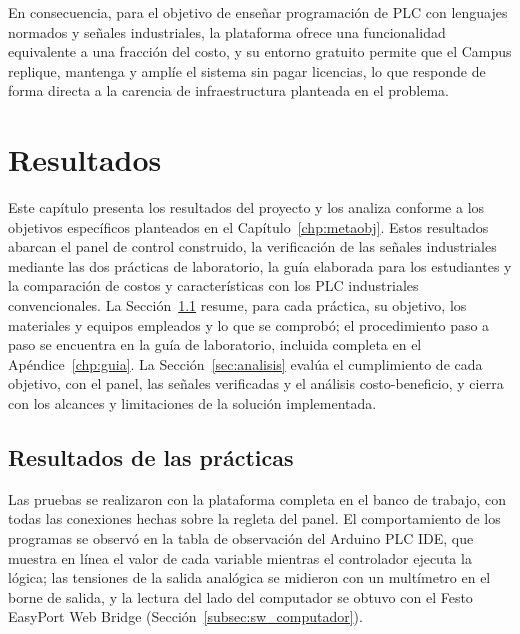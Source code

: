 \documentclass[12pt,a4paper,oneside]{report}
\begin{document}
En consecuencia, para el objetivo de enseñar programación de PLC con lenguajes normados y señales industriales, la plataforma ofrece una funcionalidad equivalente a una fracción del costo, y su entorno gratuito permite que el Campus replique, mantenga y amplíe el sistema sin pagar licencias, lo que responde de forma directa a la carencia de infraestructura planteada en el problema.


\chapter{Resultados}
\label{chp:resultados}

Este capítulo presenta los resultados del proyecto y los analiza conforme a los objetivos específicos planteados en el Capítulo~\ref{chp:metaobj}. Estos resultados abarcan el panel de control construido, la verificación de las señales industriales mediante las dos prácticas de laboratorio, la guía elaborada para los estudiantes y la comparación de costos y características con los PLC industriales convencionales. La Sección~\ref{sec:resultados} resume, para cada práctica, su objetivo, los materiales y equipos empleados y lo que se comprobó; el procedimiento paso a paso se encuentra en la guía de laboratorio, incluida completa en el Apéndice~\ref{chp:guia}. La Sección~\ref{sec:analisis} evalúa el cumplimiento de cada objetivo, con el panel, las señales verificadas y el análisis costo-beneficio, y cierra con los alcances y limitaciones de la solución implementada.

\section{Resultados de las prácticas}
\label{sec:resultados}

Las pruebas se realizaron con la plataforma completa en el banco de trabajo, con todas las conexiones hechas sobre la regleta del panel. El comportamiento de los programas se observó en la tabla de observación del Arduino PLC IDE, que muestra en línea el valor de cada variable mientras el controlador ejecuta la lógica; las tensiones de la salida analógica se midieron con un multímetro en el borne de salida, y la lectura del lado del computador se obtuvo con el Festo EasyPort Web Bridge (Sección~\ref{subsec:sw_computador}).
\end{document}
